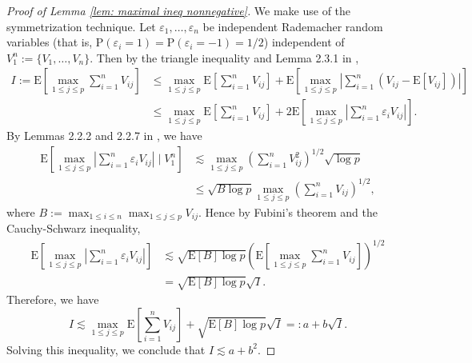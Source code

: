 \documentclass[11pt,reqno]{amsart}
\theoremstyle{definition}
\newcommand{\eps}{\varepsilon}
\newcommand{\Ep}{{\mathrm{E}}}
\renewcommand{\Pr}{{\mathrm{P}}}
\begin{document}
\begin{proof}[Proof of Lemma \ref{lem: maximal ineq nonnegative}]
We make use of the symmetrization technique. Let $\eps_{1},\dots,\eps_{n}$ be independent Rademacher random variables (that is, $\Pr (\eps_{i} = 1) = \Pr ( \eps_{i} = -1) = 1/2$) independent of $V_{1}^{n} := \{ V_{1},\dots,V_{n} \}$.
Then by the triangle inequality and  Lemma 2.3.1 in \cite{VW96},
\begin{align*}
I := \Ep [ \max_{1 \leq j \leq p} {\textstyle \sum}_{i=1}^{n} V_{ij} ] &\leq \max_{1 \leq j \leq p} \Ep [ {\textstyle \sum}_{i=1}^{n} V_{ij} ] + \Ep [ \max_{1 \leq j \leq p} | {\textstyle \sum}_{i=1}^{n} (V_{ij} - \Ep [ V_{ij} ]) |] \\
&\leq \max_{1 \leq j \leq p} \Ep [ {\textstyle \sum}_{i=1}^{n} V_{ij} ] + 2\Ep [ \max_{1 \leq j \leq p} | {\textstyle \sum}_{i=1}^{n} \eps_{i} V_{ij}  |].
\end{align*}
By Lemmas 2.2.2 and 2.2.7 in \cite{VW96}, we have
\begin{align*}
\Ep [ \max_{1 \leq j \leq p} | {\textstyle \sum}_{i=1}^{n} \eps_{i} V_{ij}  | \mid V_{1}^{n} ] &\lesssim \max_{1 \leq j \leq p} ({\textstyle \sum}_{i=1}^{n} V_{ij}^{2})^{1/2}  \sqrt{\log p}\\
&\leq   \sqrt{B \log p} \max_{1 \leq j \leq p} ({\textstyle \sum}_{i=1}^{n} V_{ij})^{1/2},
\end{align*}
where $B := \max_{1 \leq i \leq n} \max_{1 \leq j \leq p} V_{ij}$. Hence by Fubini's theorem and the Cauchy-Schwarz inequality,
\begin{align*}
\Ep [ \max_{1 \leq j \leq p} | {\textstyle \sum}_{i=1}^{n} \eps_{i} V_{ij}  | ] &\lesssim \sqrt{\Ep [ B ] \log p} ( \Ep [ \max_{1 \leq j \leq p} {\textstyle \sum}_{i=1}^{n} V_{ij} ])^{1/2} \\
& = \sqrt{\Ep [ B ] \log p}  \sqrt{I}.
\end{align*}
Therefore, we have
\begin{equation*}
I \lesssim \max_{1 \leq j \leq p} \Ep [ {\textstyle \sum}_{i=1}^{n} V_{ij} ] + \sqrt{\Ep [ B ] \log p} \sqrt{I} =: a + b \sqrt{I}.
\end{equation*}
Solving this inequality, we conclude that $I \lesssim a + b^{2}$.
\end{proof}
\end{document}
